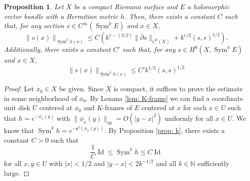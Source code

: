 \documentclass{amsart}
\newtheorem{prop}[thm]{Proposition}
\theoremstyle{definition}
\theoremstyle{remark}
\numberwithin{equation}{section}
\DeclareMathOperator{\Sym}{Sym}
\DeclareMathOperator{\Id}{Id}
\begin{document}
\begin{prop} \label{prop: standard estimate}
Let $X$ be a compact Riemann surface and $E$ a holomorphic vector bundle with a Hermitian metric $h$. Then, there exists a constant $C$ such that, for any section $s \in C^\infty(\Sym^kE)$ and $x \in X$, 
$$
\|s(x)\|_{\Sym^kh(x)} \leq C \left ( k^{r-(3/2)} \|\overline{\partial} s\|_{C^0(X)} + k^{r/2} (s,s)^{1/2} \right ).
$$
Additionally, there exists a constant $C'$ such that, for any $s \in H^0(X,\Sym^kE)$ and $x \in X$, 
$$
\|s(x)\|_{\Sym^kh(x)} \leq C' k^{1/2}(s,s)^{1/2}
$$
\end{prop}
\begin{proof}
Let $x_0 \in X$ be given. Since $X$ is compact, it suffices to prove the estimate in some neighborhood of $x_0$. By Lemma \ref{lem: K-frame} we can find a coordinate unit disk $U$ centered at $x_0$ and $K$-frames of $E$ centered at $x$ for each $x \in U$ such that $h = e^{-\phi_x(y)}$ with $\|\phi_x(y)\|_{op} = O(|y-x|^2)$ uniformly for all $x \in U$. We know that $\Sym^k h = e^{-\mathfrak{s}^k(\phi_x(y))}$. By Proposition \ref{prop: k}, there exists a constant $C > 0$ such that
\begin{equation} \label{eq : metric bounds}
\frac{1}{C} \Id \leq \Sym^k h \leq C \Id
\end{equation}
for all $x,y \in U$ with $|x| < 1/2$ and $|y-x| < 2k^{-1/2}$ and all $k \in \mathbb{N}$ sufficiently large.


\end{proof}
\end{document}
